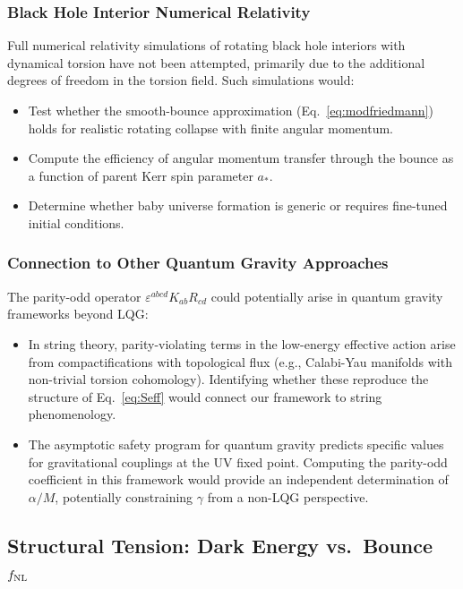 \documentclass[aps,prd,twocolumn,superscriptaddress,showpacs,preprintnumbers,nofootinbib,longbibliography,floatfix]{revtex4-2}
\newcommand{\fnl}{f_{\rm NL}}
\begin{document}
\subsubsection{Black Hole Interior Numerical Relativity}

Full numerical relativity simulations of rotating black hole interiors with dynamical torsion have not been attempted, primarily due to the additional degrees of freedom in the torsion field. Such simulations would:

\begin{itemize}[leftmargin=*]
\item Test whether the smooth-bounce approximation (Eq.~\ref{eq:modfriedmann}) holds for realistic rotating collapse with finite angular momentum.
\item Compute the efficiency of angular momentum transfer through the bounce as a function of parent Kerr spin parameter $a_*$.
\item Determine whether baby universe formation is generic or requires fine-tuned initial conditions.
\end{itemize}

\subsubsection{Connection to Other Quantum Gravity Approaches}

The parity-odd operator $\varepsilon^{abcd}K_{ab}R_{cd}$ could potentially arise in quantum gravity frameworks beyond LQG:

\begin{itemize}[leftmargin=*]
\item In string theory, parity-violating terms in the low-energy effective action arise from compactifications with topological flux (e.g., Calabi-Yau manifolds with non-trivial torsion cohomology). Identifying whether these reproduce the structure of Eq.~\eqref{eq:Seff} would connect our framework to string phenomenology.
\item The asymptotic safety program for quantum gravity predicts specific values for gravitational couplings at the UV fixed point. Computing the parity-odd coefficient in this framework would provide an independent determination of $\alpha/M$, potentially constraining $\gamma$ from a non-LQG perspective.
\end{itemize}

\subsection{Structural Tension: Dark Energy vs.\ Bounce $\fnl$}\label{sec:structural_tension}
\end{document}

